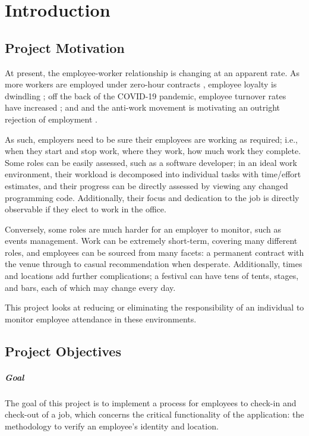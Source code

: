\chapter{Introduction}

\section{Project Motivation}

At present, the employee-worker relationship is changing at
an apparent rate.
As more workers are employed under zero-hour contracts
\parencite{zeroHourContractsStats}, employee loyalty is
dwindling \parencite{zeroHourContractsLoyalty}; off the
back of the COVID-19 pandemic, employee turnover rates have
increased \parencite{employeeTurnover}; and and the
anti-work movement is motivating an outright rejection of
employment \parencite{antiWorkMovement}.

As such, employers need to be sure their employees are
working as required; i.e., when they start and stop work,
where they work, how much work they complete.
Some roles can be easily assessed, such as a software
developer; in an ideal work environment, their workload is
decomposed into individual tasks with time/effort
estimates, and their progress can be directly assessed by
viewing any changed programming code.
Additionally, their focus and dedication to the job is
directly observable if they elect to work in the office.

Conversely, some roles are much harder for an employer to
monitor, such as events management.
Work can be extremely short-term, covering many different
roles, and employees can be sourced from many facets: a
permanent contract with the venue through to casual
recommendation when desperate.
Additionally, times and locations add further
complications; a festival can have tens of tents, stages,
and bars, each of which may change every day.

This project looks at  reducing or eliminating the
responsibility of an individual to  monitor employee
attendance in these environments.

\section{Project Objectives}

\paragraph{Goal}
The goal of this project is to implement a process for
employees to \gls{check-in} and \gls{check-out} of a job,
which concerns the critical functionality of the
application: the methodology to verify an employee's
identity and location.

